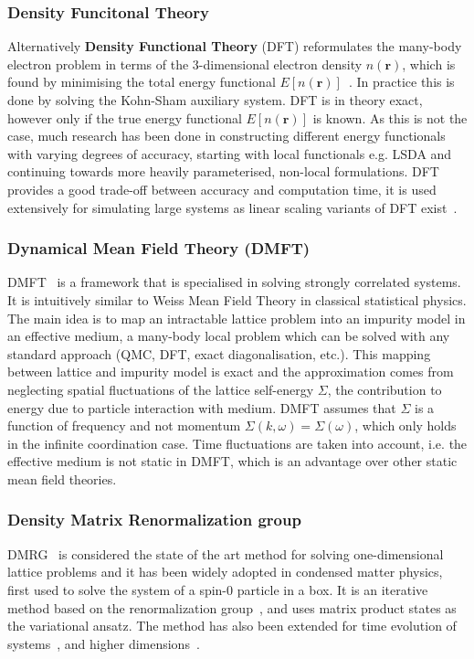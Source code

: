 \subsubsection{Density Funcitonal Theory}
Alternatively \textbf{Density Functional Theory} (DFT) reformulates the many-body electron problem in terms of the $3$-dimensional electron density $n(\mathbf{r})$, which is found by minimising the total energy functional $E[n(\mathbf{r})]$~\cite{hohenberg1964inhomogeneous}. In practice this is done by solving the Kohn-Sham auxiliary system. DFT is in theory exact, however only if the true energy functional $E[n(\mathbf{r})]$ is known. As this is not the case, much research has been done in constructing different energy functionals with varying degrees of accuracy, starting with local functionals e.g. LSDA and continuing towards more heavily parameterised, non-local formulations. DFT provides a good trade-off between accuracy and computation time, it is used extensively for simulating large systems as linear scaling variants of DFT exist~\cite{skylaris2005introducing}. 

\subsubsection{Dynamical Mean Field Theory (DMFT)}
DMFT~\cite{held2007electronic} is a framework that is specialised in solving strongly correlated systems. It is intuitively similar to Weiss Mean Field Theory in classical statistical physics. The main idea is to map an intractable lattice problem into an impurity model in an effective medium, a many-body local problem which can be solved with any standard approach (QMC, DFT, exact diagonalisation, etc.). This mapping between lattice and impurity model is exact and the approximation comes from neglecting spatial fluctuations of the lattice self-energy $\Sigma$, the contribution to energy due to particle interaction with medium. DMFT assumes that $\Sigma$ is a function of frequency and not momentum $\Sigma(k, \omega) = \Sigma(\omega)$, which only holds in the infinite coordination case. Time fluctuations are taken into account, i.e. the effective medium is not static in DMFT, which is an advantage over other static mean field theories. 

\subsubsection{Density Matrix Renormalization group}
DMRG~\cite{white1992density} is considered the state of the art method for solving one-dimensional lattice problems and it has been widely adopted in condensed matter physics, first used to solve the system of a spin-0 particle in a box. It is an iterative method based on the renormalization group~\cite{wilson1975renormalization}, and uses matrix product states as the variational ansatz. The method has also been extended for time evolution of systems~\cite{feiguin2005time}, and higher dimensions~\cite{verstraete2004renormalization}.

